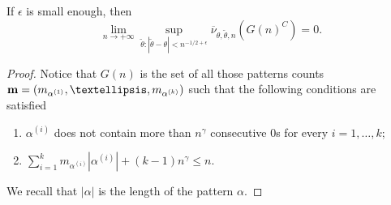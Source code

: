 \documentclass[10pt,a4paper]{amsart}
\begin{document}
\begin{lemma}
If $\epsilon$ is small enough, then
$$\lim_{n \rightarrow +\infty} \sup_{\tilde{\theta}:|\tilde{\theta}-\theta|<n^{-1/2+\epsilon}} \overline{\nu}_{\theta, \tilde{\theta},n}(G(n)^C)=0.$$
\end{lemma}

\begin{proof}Notice that $G(n)$ is the set of all those patterns counts ${\bf m}=(m_{\alpha^{(1)}}, \dots, m_{\alpha^{(k)}})$ such that the following conditions are satisfied
\begin{enumerate}
\item $\alpha^{(i)}$ does not contain more than $n^\gamma$ consecutive $0$s for every $i=1,\dots, k$;
\item $\sum_{i=1}^{k}m_{\alpha^{(i)}}|\alpha^{(i)}| + (k-1)n^{\gamma} \leq n$.
\end{enumerate}
We recall that $|\alpha|$ is the length of the pattern $\alpha.$


\end{proof}
\end{document}
